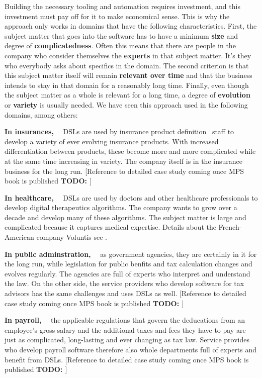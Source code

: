 \documentclass[runningheads]{llncs}
\newcommand\parhead[1]{\vspace{1mm}\noindent\textbf{{#1}}\ \ }
\newcommand\todo[1]{\vspace{1mm}\noindent\textbf{\color{red} {{TODO: {#1}} }}}
\begin{document}
Building the necessary tooling and automation requires investment, and this
investment must pay off for it to make economical sense. This is why the
approach only works in domains that have the following characteristics. First,
the subject matter that goes into the software has to have a minimum
\textbf{size} and degree of \textbf{complicatedness}. Often this means that
there are people in the company who consider themselves the \textbf{experts} in
that subject matter. It's they who everybody asks about specifics in the domain.
The second criterion is that this subject matter itself will remain
\textbf{relevant over time} and that the business intends to stay in that domain
for a reasonably long time. Finally, even though the subject matter as a whole
is relevant for a long time, a degree of \textbf{evolution} or \textbf{variety}
is usually needed. We have seen this approach used in the following domains, among others:

\parhead{In insurances,} DSLs are used by insurance product definition~\cite{zurich} staff to develop a
variety of ever evolving insurance products. With increased differentiation
between products, these become more and more complicated while at the same time
increasing in variety. The company itself is in the insurance business for the
long run. [Reference to detailed case study coming once MPS book is published\todo{}]

\parhead{In healthcare,} DSLs are used by doctors and other healthcare
professionals to develop digital therapeutics algorithms. The company wants to
grow over a decade and develop many of these algorithms. The subject matter is
large and complicated because it captures medical expertise. Details about
the French-American company Voluntis see \cite{voelter2019vol}.

\parhead{In public adminstration,} as government agencies, they are certainly in
it for the long run, while legislation for public benfits and tax calculation
changes and evolves regularly. The agencies are full of experts who interpret
and understand the law. On the other side, the service providers who develop
software for tax advisors has the same challenges and uses DSLs as well.
[Reference to detailed case study coming once MPS book is published\todo{}]

\parhead{In payroll,} the applicable regulations that govern the  
deducations from an employee's gross salary and the additional taxes and fees
they have to pay are just as complicated, long-lasting and ever changing as tax
law. Service provides who develop payroll software therefore also whole 
departments full of experts and benefit from DSLs. 
[Reference to detailed case study coming once MPS book is published\todo{}]
\end{document}
